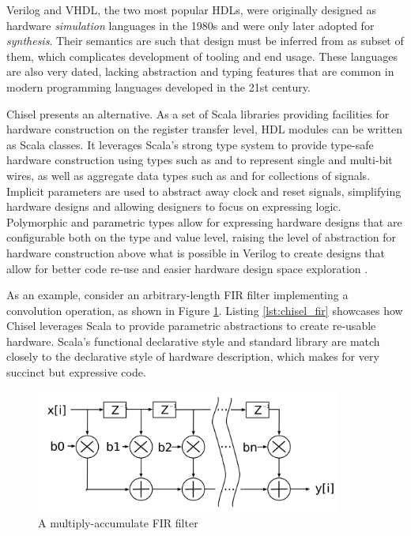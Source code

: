 Verilog and VHDL, the two most popular HDLs, were originally designed as hardware \textit{simulation} languages in the 1980s and were only later adopted for \textit{synthesis}. Their semantics are such that design must be inferred from as subset of them, which complicates development of tooling and end usage. These languages are also very dated, lacking abstraction and typing features that are common in modern programming languages developed in the 21st century.

Chisel presents an alternative. As a set of Scala libraries providing facilities for hardware construction on the register transfer level, HDL modules can be written as Scala classes. It leverages Scala's strong type system to provide type-safe hardware construction using types such as  and  to represent single and multi-bit wires, as well as aggregate data types such as  and  for collections of signals. Implicit parameters are used to abstract away clock and reset signals, simplifying hardware designs and allowing designers to focus on expressing logic. Polymorphic and parametric types allow for expressing hardware designs that are configurable both on the type and value level, raising the level of abstraction for hardware construction above what is possible in Verilog to create designs that allow for better code re-use and easier hardware design space exploration \cite{chisel}.

As an example, consider an arbitrary-length FIR filter implementing a convolution operation, as shown in Figure \ref{fig:fir}. Listing \ref{lst:chisel_fir} showcases how Chisel leverages Scala to provide parametric abstractions to create re-usable hardware. Scala's functional declarative style and standard library are match closely to the declarative style of hardware description, which makes for very succinct but expressive code.

\begin{figure}[H]
    \centering
    \includegraphics[width=0.9\textwidth]{../img/fir_filter.png}
    \caption{A multiply-accumulate FIR filter \cite{chisel_site}}
    \label{fig:fir}
\end{figure}


